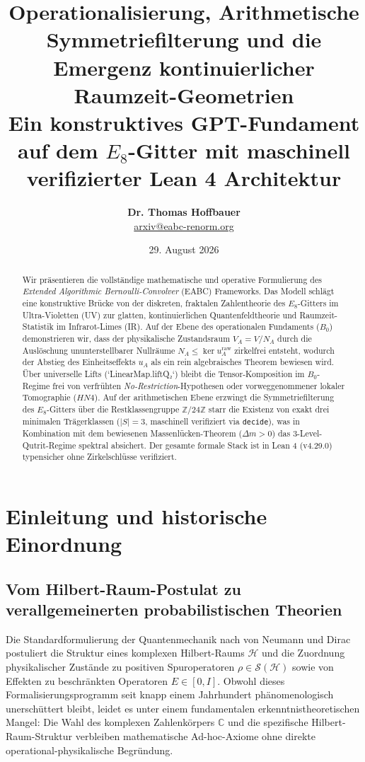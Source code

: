 \documentclass[11pt,a4paper]{article}
\title{\textbf{Operationalisierung, Arithmetische Symmetriefilterung und die Emergenz kontinuierlicher Raumzeit-Geometrien}\\
\large Ein konstruktives GPT-Fundament auf dem $E_8$-Gitter mit maschinell verifizierter Lean 4 Architektur}
\author{\textbf{Dr. Thomas Hoffbauer}\\
\small\href{mailto:arxiv@eabc-renorm.org}{arxiv@eabc-renorm.org}}
\date{29. August 2026}
\begin{document}
\maketitle

\begin{abstract}
Wir präsentieren die vollständige mathematische und operative Formulierung des \emph{Extended Algorithmic Bernoulli-Convolver} (EABC) Frameworks. Das Modell schlägt eine konstruktive Brücke von der diskreten, fraktalen Zahlentheorie des $E_8$-Gitters im Ultra-Violetten (UV) zur glatten, kontinuierlichen Quantenfeldtheorie und Raumzeit-Statistik im Infrarot-Limes (IR). Auf der Ebene des operationalen Fundaments ($B_0$) demonstrieren wir, dass der physikalische Zustandsraum $V_A = V / N_A$ durch die Auslöschung ununterstellbarer Nullräume $N_A \le \ker u_A^{\text{raw}}$ zirkelfrei entsteht, wodurch der Abstieg des Einheitseffekts $u_A$ als ein rein algebraisches Theorem bewiesen wird. Über universelle Lifts (`LinearMap.liftQ₂`) bleibt die Tensor-Komposition im $B_0$-Regime frei von verfrühten \emph{No-Restriction}-Hypothesen oder vorweggenommener lokaler Tomographie ($HN4$). Auf der arithmetischen Ebene erzwingt die Symmetriefilterung des $E_8$-Gitters über die Restklassengruppe $\mathbb{Z}/24\mathbb{Z}$ starr die Existenz von exakt drei minimalen Trägerklassen ($|S|=3$, maschinell verifiziert via \texttt{decide}), was in Kombination mit dem bewiesenen Massenlücken-Theorem ($\Delta m > 0$) das 3-Level-Qutrit-Regime spektral absichert. Der gesamte formale Stack ist in Lean 4 (v4.29.0) typensicher ohne Zirkelschlüsse verifiziert.
\end{abstract}

\tableofcontents

\newpage

\section{Einleitung und historische Einordnung}

\subsection{Vom Hilbert-Raum-Postulat zu verallgemeinerten probabilistischen Theorien}

Die Standardformulierung der Quantenmechanik nach von Neumann und Dirac postuliert die Struktur eines komplexen Hilbert-Raums $\mathcal{H}$ und die Zuordnung physikalischer Zustände zu positiven Spuroperatoren $\rho \in \mathcal{S}(\mathcal{H})$ sowie von Effekten zu beschränkten Operatoren $E \in [0, I]$. Obwohl dieses Formalisierungsprogramm seit knapp einem Jahrhundert phänomenologisch unerschüttert bleibt, leidet es unter einem fundamentalen erkenntnistheoretischen Mangel: Die Wahl des komplexen Zahlenkörpers $\mathbb{C}$ und die spezifische Hilbert-Raum-Struktur verbleiben mathematische Ad-hoc-Axiome ohne direkte operational-physikalische Begründung.
\end{document}
